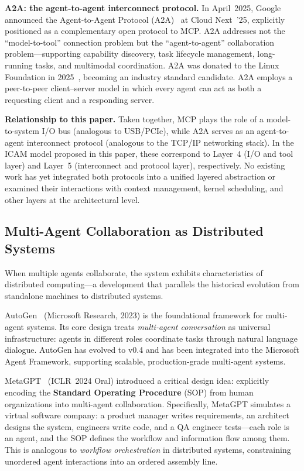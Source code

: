 \documentclass[11pt,a4paper]{article}
\begin{document}
\textbf{A2A: the agent-to-agent interconnect protocol.}
In April~2025, Google announced the Agent-to-Agent Protocol (A2A)~\cite{google_a2a_2025} at Cloud Next~'25, explicitly positioned as a complementary open protocol to MCP.
A2A addresses not the ``model-to-tool'' connection problem but the ``agent-to-agent'' collaboration problem---supporting capability discovery, task lifecycle management, long-running tasks, and multimodal coordination.
A2A was donated to the Linux Foundation in 2025~\cite{a2alinux2025}, becoming an industry standard candidate.
A2A employs a peer-to-peer client--server model in which every agent can act as both a requesting client and a responding server.

\textbf{Relationship to this paper.}
Taken together, MCP plays the role of a model-to-system I/O bus (analogous to USB/PCIe), while A2A serves as an agent-to-agent interconnect protocol (analogous to the TCP/IP networking stack).
In the ICAM model proposed in this paper, these correspond to Layer~4 (I/O and tool layer) and Layer~5 (interconnect and protocol layer), respectively.
No existing work has yet integrated both protocols into a unified layered abstraction or examined their interactions with context management, kernel scheduling, and other layers at the architectural level.

\subsection{Multi-Agent Collaboration as Distributed Systems}
\label{sec:related-multiagent}

When multiple agents collaborate, the system exhibits characteristics of distributed computing---a development that parallels the historical evolution from standalone machines to distributed systems.

AutoGen~\cite{wu2023autogen} (Microsoft Research, 2023) is the foundational framework for multi-agent systems.
Its core design treats \textit{multi-agent conversation} as universal infrastructure: agents in different roles coordinate tasks through natural language dialogue.
AutoGen has evolved to v0.4 and has been integrated into the Microsoft Agent Framework, supporting scalable, production-grade multi-agent systems.

MetaGPT~\cite{metagpt2023} (ICLR~2024 Oral) introduced a critical design idea: explicitly encoding the \textbf{Standard Operating Procedure} (SOP) from human organizations into multi-agent collaboration.
Specifically, MetaGPT simulates a virtual software company: a product manager writes requirements, an architect designs the system, engineers write code, and a QA engineer tests---each role is an agent, and the SOP defines the workflow and information flow among them.
This is analogous to \textit{workflow orchestration} in distributed systems, constraining unordered agent interactions into an ordered assembly line.
\end{document}
